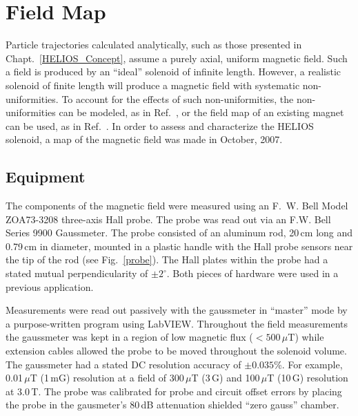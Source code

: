 \section{Field Map}
Particle trajectories calculated analytically, such as those presented in Chapt.~\ref{HELIOS_Concept}, assume a purely axial, uniform magnetic field.  Such a field is produced by an ``ideal'' solenoid of infinite length.  However, a realistic solenoid of finite length will produce a magnetic field with systematic non-\-uni\-for\-mi\-ties.  To account for the effects of such non-uniformities, the non-uniformities can be modeled, as in Ref.~\cite{Wuosmaa_2003}, or the field map of an existing magnet can be used, as in Ref.~\cite{Wuosmaa_2007}.  In order to assess and characterize the HELIOS solenoid, a map of the magnetic field was made in October, 2007.
\subsection{Equipment}
The components of the magnetic field were measured using an F.~W. Bell Model ZOA73-3208 three-axis Hall probe.  The probe was read out via an F.W. Bell Series 9900 Gaussmeter.  The probe consisted of an aluminum rod, 20\,cm long and 0.79\,cm in diameter, mounted in a plastic handle with the Hall probe sensors near the tip of the rod (see Fig.~\ref{probe}).  The Hall plates within the probe had a stated mutual perpendicularity of $\pm 2^\circ$. Both pieces of hardware were used in a previous application.  

Measurements were read out passively with the gaussmeter in ``master'' mode by a purpose-written program using LabVIEW\texttrademark.  Throughout the field measurements the gaussmeter was kept in a region of low magnetic flux ($<500$\,$\mu$T) while extension cables allowed the probe to be moved throughout the solenoid volume.  The gaussmeter had a stated DC resolution accuracy of $\pm0.035$\%.  For example, 0.01\,$\mu$T (1\,mG) resolution at a field of 300\,$\mu$T (3\,G) and 100\,$\mu$T (10\,G) resolution at 3.0\,T.  The probe was calibrated for probe and circuit offset errors by placing the probe in the gausmeter's 80\,dB attenuation shielded ``zero gauss'' chamber.
 
